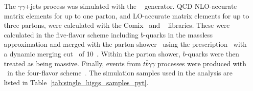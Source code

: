 \documentclass[PAPER, cernpreprint, texlive=2016, paper=a4, USenglish, texmf]{atlasdoc}
\begin{document}
 
 
The $\gamma\gamma$+jets process was simulated with the \SHERPA[2.2.4]~\cite{Bothmann:2019yzt} generator. 
QCD NLO-accurate matrix elements for up to one parton, and LO-accurate matrix elements for up to three partons, were calculated with the Comix~\cite{Gleisberg:2008fv} and \OPENLOOPS~\cite{Buccioni:2019sur,Cascioli:2011va,Denner:2016kdg} libraries. These were calculated in the five-flavor scheme including $b$-quarks in the massless approximation and merged with the \SHERPA parton shower~\cite{Schumann:2007mg} using the \MEPSatNLO prescription~\cite{Hoeche:2011fd,Hoeche:2012yf} with a dynamic merging cut~\cite{Siegert:2016bre} of 10~\GeV. Within the parton shower, $b$-quarks were then treated as being massive.
Finally, events from $t\bar{t} \gamma \gamma$ processes were produced with \MGNLO\ in the four-flavor scheme~\cite{Alwall:2014hca}. The simulation samples used in the analysis are listed in Table~\ref{tab:single_higgs_samples_pyt}.
 
\end{document}
